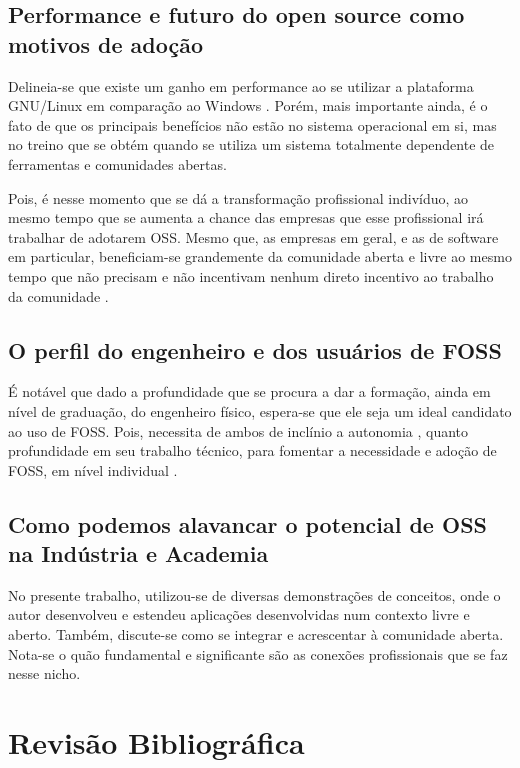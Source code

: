 \documentclass[
12pt,				%
openright,			%
oneside,			%
a4paper,			%
english,			%
french,				%
spanish,			%
brazil,				%
]{abntex2}
\begin{document}
\section{Performance e futuro do open source como motivos de adoção}

Delineia-se que existe um ganho em performance ao se utilizar a
plataforma GNU/Linux em comparação ao Windows \cite{sulaiman2021comparison}. Porém, mais importante
ainda, é o fato de que os principais benefícios não estão no sistema
operacional em si, mas no treino que se obtém quando se utiliza um
sistema totalmente dependente de ferramentas e comunidades
abertas.

Pois, é nesse momento que se dá a transformação profissional
indivíduo, ao mesmo tempo que se aumenta a chance das empresas que
esse profissional irá trabalhar de adotarem OSS. Mesmo que, as
empresas em geral, e as de software em particular, beneficiam-se
grandemente da comunidade aberta e livre ao mesmo tempo que não
precisam e não incentivam nenhum direto incentivo ao trabalho da
comunidade \cite{hauge2008adoption}.

\section{O perfil do engenheiro e dos usuários de FOSS}

É notável que dado a profundidade que se procura a dar a formação,
ainda em nível de graduação, do engenheiro físico, espera-se que ele
seja um ideal candidato ao uso de FOSS. Pois, necessita de ambos de
inclínio a autonomia \cite{schrape2019open,racero2020predicting}, quanto profundidade em seu trabalho técnico,
para fomentar a necessidade e adoção de FOSS, em nível individual
\cite{li2013all,gallego2015open}.

\section{Como podemos alavancar o potencial de OSS na Indústria e Academia}

No presente trabalho, utilizou-se de diversas demonstrações de
conceitos, onde o autor desenvolveu e estendeu aplicações
desenvolvidas num contexto livre e aberto. Também, discute-se como se
integrar e acrescentar à comunidade aberta. Nota-se o quão fundamental
e significante são as conexões profissionais que se faz nesse nicho.

\chapter{Revisão Bibliográfica}
\end{document}
